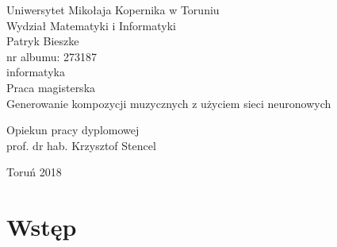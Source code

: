 \documentclass[12pt,a4paper,twoside]{mwart}
\begin{document}
  
\begin{titlepage}
	\begin{center}
		\large Uniwersytet Mikołaja Kopernika w Toruniu\\
		\large Wydział Matematyki i Informatyki\\
		\vspace{3cm} 
		\large Patryk Bieszke\\
			nr albumu: 273187\\
			informatyka\\
		\vspace{2cm}
		Praca magisterska\\
	
		\vspace{3cm} 
		\huge Generowanie kompozycji muzycznych z użyciem sieci neuronowych\\
	\end{center}
	\hfill
	\begin{minipage}{6cm}
		\vspace{3cm}
		Opiekun pracy dyplomowej\\
		prof. dr hab. Krzysztof Stencel
	\end{minipage}
	\vspace{4cm}
	\begin{center}
		Toruń 2018\\
	\end{center}
\end{titlepage}





\clearpage
\thispagestyle{empty}
\mbox{}

\tableofcontents 

\clearpage

\setcounter{secnumdepth}{0}
\section{Wstęp}
\label{sec:wstep}

\newpage
\end{document}
